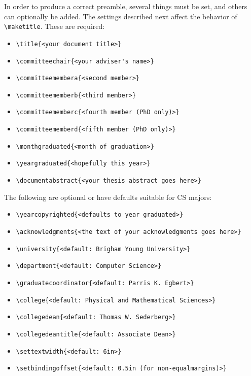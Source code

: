 \documentclass[phd,electronic,twosidetoc,letterpaper,chaptercenter,parttop,lol,lof,lot]{byumsphd}
\begin{document}
In order to produce a correct preamble, several things must be set, and others can optionally be added.  The settings described next affect the behavior of \verb|\maketitle|.  These are required:
\begin{itemize}
    \item \verb|\title{<your document title>}|
    \item \verb|\committeechair{<your adviser's name>}|
    \item \verb|\committeemembera{<second member>}|
    \item \verb|\committeememberb{<third member>}|
    \item \verb|\committeememberc{<fourth member (PhD only)>}|
    \item \verb|\committeememberd{<fifth member (PhD only)>}|
    \item \verb|\monthgraduated{<month of graduation>}|
    \item \verb|\yeargraduated{<hopefully this year>}|
    \item \verb|\documentabstract{<your thesis abstract goes here>}|
\end{itemize}
The following are optional or have defaults suitable for CS majors:
\begin{itemize}
    \item \verb|\yearcopyrighted{<defaults to year graduated>}|
    \item \verb|\acknowledgments{<the text of your acknowledgments goes here>}|
    \item \verb|\university{<default: Brigham Young University>}|
    \item \verb|\department{<default: Computer Science>}|
    \item \verb|\graduatecoordinator{<default: Parris K. Egbert>}|
    \item \verb|\college{<default: Physical and Mathematical Sciences>}|
    \item \verb|\collegedean{<default: Thomas W. Sederberg>}|
    \item \verb|\collegedeantitle{<default: Associate Dean>}|
    \item \verb|\settextwidth{<default: 6in>}|
    \item \verb|\setbindingoffset{<default: 0.5in (for non-equalmargins)>}|
\end{itemize}
\end{document}
